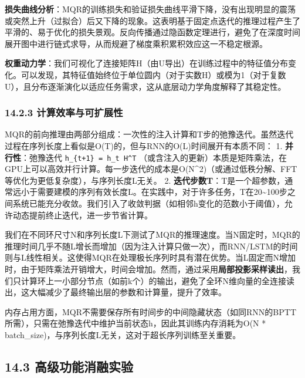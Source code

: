 \documentclass[
  12pt,
]{article}
\begin{document}
\textbf{损失曲线分析}：MQR的训练损失和验证损失曲线平滑下降，没有出现明显的震荡或突然上升（过拟合）后又下降的现象。这表明基于固定点迭代的推理过程产生了平滑的、易于优化的损失景观。反向传播通过隐函数定理进行，避免了在深度时间展开图中进行链式求导，从而规避了梯度乘积累积效应这一不稳定根源。

\textbf{权重动力学}：我们可视化了连接矩阵H（由U导出）在训练过程中的特征值分布变化。可以发现，其特征值始终位于单位圆内（对于实数H）或模为1（对于复数U），且分布逐渐演化以适应任务需求，这从底层动力学角度解释了其稳定性。

\hypertarget{ux8ba1ux7b97ux6548ux7387ux4e0eux53efux6269ux5c55ux6027}{%
\subsubsection{14.2.3
计算效率与可扩展性}\label{ux8ba1ux7b97ux6548ux7387ux4e0eux53efux6269ux5c55ux6027}}

MQR的前向推理由两部分组成：一次性的注入计算和T步的弛豫迭代。虽然迭代过程在序列长度上看似是O(T)的，但与RNN的O(L)时间展开有本质不同：
1. \textbf{并行性}：弛豫迭代 \texttt{h\_\{t+1\}\ =\ h\_t\ H\^{}T}
（或含注入的更新）本质是矩阵乘法，在GPU上可以高效并行计算。每一步迭代的成本是O(N\^{}2)（或通过低秩分解、FFT等优化为更低复杂度），与序列长度L无关。
2.
\textbf{迭代步数T}：T是一个超参数，通常远小于需要建模的序列有效长度L。在实践中，对于许多任务，T在20\textasciitilde100步之间系统已能充分收敛。我们引入了收敛判据（如相邻h变化的范数小于阈值\epsilon），允许动态提前终止迭代，进一步节省计算。

我们在不同环尺寸N和序列长度L下测试了MQR的推理速度。当N固定时，MQR的推理时间几乎不随L增长而增加（因为注入计算只做一次），而RNN/LSTM的时间则与L线性相关。这使得MQR在处理极长序列时具有潜在优势。当L固定而N增加时，由于矩阵乘法开销增大，时间会增加。然而，通过采用\textbf{局部投影采样读出}，我们只计算环上一小部分节点（如前k个）的输出，避免了全环N维向量的全连接读出，这大幅减少了最终输出层的参数和计算量，提升了效率。

内存占用方面，MQR不需要保存所有时间步的中间隐藏状态（如同RNN的BPTT所需），只需在弛豫迭代中维护当前状态h，因此其训练内存消耗为O(N
* batch\_size)，与序列长度L无关，这对于超长序列训练至关重要。

\hypertarget{ux9ad8ux7ea7ux529fux80fdux6d88ux878dux5b9eux9a8c}{%
\subsection{14.3
高级功能消融实验}\label{ux9ad8ux7ea7ux529fux80fdux6d88ux878dux5b9eux9a8c}}
\end{document}
